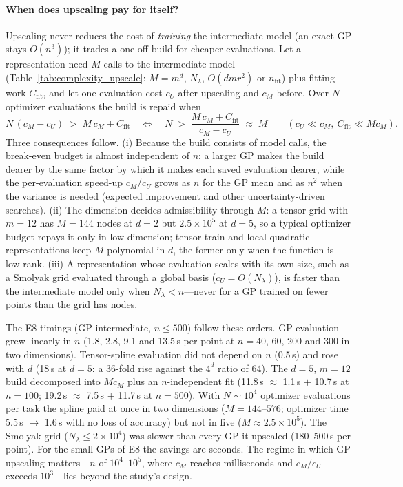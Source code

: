 \paragraph{When does upscaling pay for itself?}
Upscaling never reduces the cost of \emph{training} the intermediate model (an exact GP stays $O(n^3)$); it trades a
one-off build for cheaper evaluations. Let a representation need $M$ calls to the intermediate model
(Table~\ref{tab:complexity_upscale}: $M=m^d$, $N_\lambda$, $O(dmr^2)$ or $n_{\mathrm{fit}}$) plus fitting work
$C_{\mathrm{fit}}$, and let one evaluation cost $c_U$ after upscaling and $c_M$ before. Over $N$ optimizer evaluations
the build is repaid when
\begin{equation}
  N\,(c_M-c_U) \;>\; M\,c_M + C_{\mathrm{fit}}
  \quad\Longleftrightarrow\quad
  N \;>\; \frac{M\,c_M + C_{\mathrm{fit}}}{c_M-c_U} \;\approx\; M
  \qquad (c_U \ll c_M,\ C_{\mathrm{fit}} \ll M c_M).
  \label{eq:upscale_breakeven}
\end{equation}
Three consequences follow. (i) Because the build consists of model calls, the break-even budget is almost independent
of $n$: a larger GP makes the build dearer by the same factor by which it makes each saved evaluation dearer, while the
per-evaluation speed-up $c_M/c_U$ grows as $n$ for the GP mean and as $n^2$ when the variance is needed (expected
improvement and other uncertainty-driven searches). (ii) The dimension decides admissibility through $M$: a tensor grid
with $m=12$ has $M=144$ nodes at $d=2$ but $2.5\times10^5$ at $d=5$, so a typical optimizer budget repays it only in low
dimension; tensor-train and local-quadratic representations keep $M$ polynomial in $d$, the former only when the
function is low-rank. (iii) A representation whose evaluation scales with its own size, such as a Smolyak grid evaluated
through a global basis ($c_U=O(N_\lambda)$), is faster than the intermediate model only when $N_\lambda<n$---never for
a GP trained on fewer points than the grid has nodes.

The E8 timings (GP intermediate, $n\le500$) follow these orders. GP evaluation grew linearly in $n$ (1.8, 2.8, 9.1 and
13.5\,\textmu s per point at $n=40$, 60, 200 and 300 in two dimensions). Tensor-spline evaluation did not depend on $n$
(0.5\,\textmu s) and rose with $d$ (18\,\textmu s at $d=5$: a 36-fold rise against the $4^d$ ratio of 64). The $d=5$,
$m=12$ build decomposed into $Mc_M$ plus an $n$-independent fit (11.8\,s $\approx$ 1.1\,s $+$ 10.7\,s at $n=100$;
19.2\,s $\approx$ 7.5\,s $+$ 11.7\,s at $n=500$). With $N\sim10^4$ optimizer evaluations per task the spline paid at
once in two dimensions ($M=144$--$576$; optimizer time 5.5\,s $\to$ 1.6\,s with no loss of accuracy) but not in five
($M\approx2.5\times10^5$). The Smolyak grid ($N_\lambda\le2\times10^4$) was slower than every GP it upscaled
(180--500\,\textmu s per point). For the small GPs of E8 the savings are seconds. The regime in which GP upscaling
matters---$n$ of $10^4$--$10^5$, where $c_M$ reaches milliseconds and $c_M/c_U$ exceeds $10^3$---lies beyond the study's
design.
